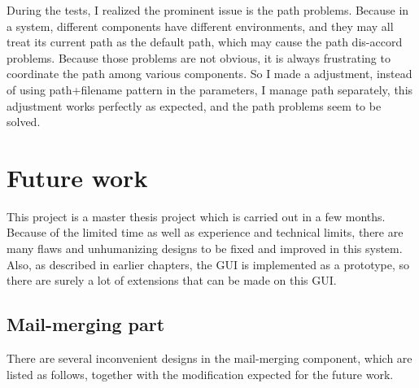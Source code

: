 \documentclass[12pt,twoside,a4paper]{report}
\begin{document}
  During the tests, I realized the prominent issue is the path problems. Because in a system, different components have different environments, and they may all treat its current path as the default path, which may cause the path dis-accord problems. Because those problems are not obvious, it is always frustrating to coordinate the path among various components. So I made a adjustment, instead of using path+filename pattern in the parameters, I manage path separately, this adjustment works perfectly as expected, and the path problems seem to be solved.

\chapter{Future work}

  This project is a master thesis project which is carried out in a few months. Because of the limited time as well as experience and technical limits, there are many flaws and unhumanizing designs to be fixed and improved in this system. Also, as described in earlier chapters, the GUI is implemented as a prototype, so there are surely a lot of extensions that can be made on this GUI.

\section{Mail-merging part}

  There are several inconvenient designs in the mail-merging component, which are listed as follows, together with the modification expected for the future work.
\end{document}

